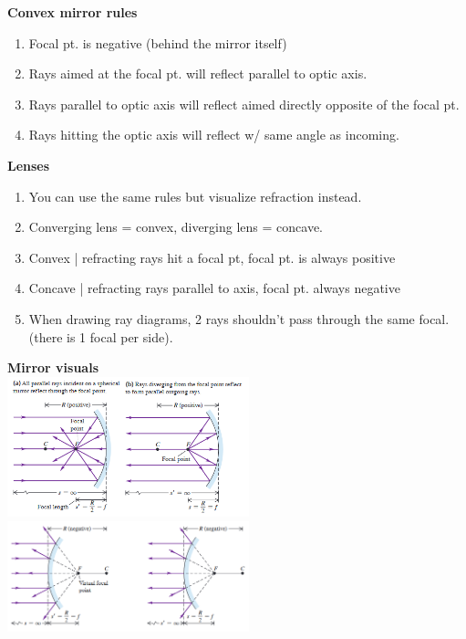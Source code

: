 \documentclass{article}
\begin{document}
\vspace{-3mm}
\textbf{Convex mirror rules}
\begin{enumerate}
    \vspace{-2mm}
    \item Focal pt. is negative (behind the mirror itself)
    \vspace{-3mm}
    \item Rays aimed at the focal pt. will reflect parallel to optic axis.
    \vspace{-3mm}
    \item Rays parallel to optic axis will reflect aimed directly opposite of the focal pt.
    \vspace{-3mm}
    \item Rays hitting the optic axis will reflect w/ same angle as incoming.
\end{enumerate}
\vspace{-2mm}
\textbf{Lenses}
\begin{enumerate}
    \vspace{-2mm}
    \item You can use the same rules but visualize refraction instead.
    \vspace{-3mm}
    \item Converging lens = convex, diverging lens = concave.
    \vspace{-3mm}
    \item Convex | refracting rays hit a focal pt, focal pt. is always positive
    \vspace{-3mm}
    \item Concave | refracting rays parallel to axis, focal pt. always negative
    \vspace{-3mm}
    \item When drawing ray diagrams, 2 rays shouldn't pass through the same focal. (there is 1 focal per side).
\end{enumerate}
\pagebreak
\textbf{Mirror visuals} \\
\includegraphics[width=7cm]{concave.png}
\includegraphics[width=7cm]{convex.png}
\end{document}
